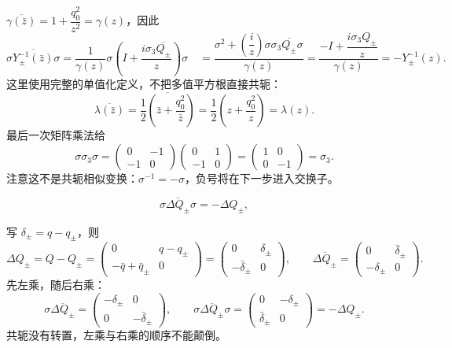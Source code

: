 \documentclass[lang=cn,scheme=chinese,mode=simple,device=normal,color=blue,
math=cm,thmcnt=section,12pt]{elegantbook}
\newcommand{\conj}[1]{\overline{#1}}
\newcommand{\eqq}[2]{\tag{#1}\label{eq:#1}#2}
\begin{document}
\begin{callout}[计算：(6.4.43) 中三个恒等式的逐项验证]
    $\overline{\gamma(\bar z)}=1+\dfrac{q_0^2}{z^2}=\gamma(z)$，因此
    \[
        \sigma\overline{Y_\pm^{-1}(\bar z)}\sigma
        =\dfrac{1}{\gamma(z)}\sigma\left(I+\dfrac{i\sigma_3\overline{Q_\pm}}{z}\right)\sigma\quad
        =\dfrac{\sigma^2+(\dfrac{i}{z})\sigma\sigma_3\overline{Q_\pm}\sigma}{\gamma(z)}
        =\dfrac{-I+\dfrac{i\sigma_3Q_\pm}{z}}{\gamma(z)}=-Y_\pm^{-1}(z).
    \]
    这里使用完整的单值化定义，不把多值平方根直接共轭：
    \[
        \overline{\lambda(\bar z)}=\overline{\dfrac{1}{2}\left(\bar z+\dfrac{q_0^2}{\bar z}\right)}
        =\dfrac{1}{2}\left(z+\dfrac{q_0^2}{z}\right)=\lambda(z).
    \]
    最后一次矩阵乘法给
    \[
        \sigma\sigma_3\sigma=\begin{pmatrix}0&-1\\-1&0\end{pmatrix}
        \begin{pmatrix}0&1\\-1&0\end{pmatrix}
        =\begin{pmatrix}1&0\\0&-1\end{pmatrix}=\sigma_3.
    \]
    注意这不是共轭相似变换：$\sigma^{-1}=-\sigma$，负号将在下一步进入交换子。
\end{callout}

\begin{equation}\eqq{6.4.44}{\sigma\conj{\Delta Q_\pm}\sigma=-\Delta Q_\pm,}\end{equation}

\begin{callout}
    写 $\delta_\pm=q-q_\pm$，则
    \[
        \Delta Q_\pm=Q-Q_\pm=\begin{pmatrix}0&q-q_\pm\\-\bar q+\bar q_\pm&0\end{pmatrix}
        =\begin{pmatrix}0&\delta_\pm\\-\bar\delta_\pm&0\end{pmatrix},\qquad
        \overline{\Delta Q_\pm}=\begin{pmatrix}0&\bar\delta_\pm\\-\delta_\pm&0\end{pmatrix}.
    \]
    先左乘，随后右乘：
    \[
        \sigma\overline{\Delta Q_\pm}=\begin{pmatrix}-\delta_\pm&0\\0&-\bar\delta_\pm\end{pmatrix},\qquad
        \sigma\overline{\Delta Q_\pm}\sigma=\begin{pmatrix}0&-\delta_\pm\\\bar\delta_\pm&0\end{pmatrix}=-\Delta Q_\pm.
    \]
    共轭没有转置，左乘与右乘的顺序不能颠倒。
\end{callout}
\end{document}

